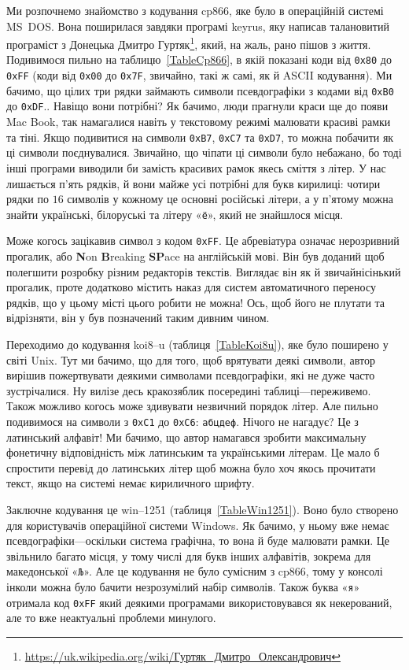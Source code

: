 \documentclass{book}
\newcommand{\bitstr}[1]{{\tt #1}}
\newcommand{\hexstr}[1]{{\tt 0x#1}}
\newcommand{\chr}[1]{«\texttt{#1}»}
\newcommand{\Gurtyak}{\href{https://uk.wikipedia.org/wiki/\%D0\%93\%D1\%83\%D1\%80\%D1\%82\%D1\%8F\%D0\%BA_\%D0\%94\%D0\%BC\%D0\%B8\%D1\%82\%D1\%80\%D0\%BE_\%D0\%9E\%D0\%BB\%D0\%B5\%D0\%BA\%D1\%81\%D0\%B0\%D0\%BD\%D0\%B4\%D1\%80\%D0\%BE\%D0\%B2\%D0\%B8\%D1\%87}{https://uk.wikipedia.org/wiki/Гуртяк\_Дмитро\_Олександрович}}
\begin{document}
Ми розпочнемо знайомство з кодування cp866, яке було в операційній системі MS~DOS.
Вона поширилася завдяки програмі keyrus, яку написав талановитий програміст з Донецька Дмитро Гуртяк\footnote{\Gurtyak}, який, на жаль, рано пішов з життя.
Подивимося пильно на таблицю~\ref{TableCp866}, в якій показані коди від \hexstr{80} до \hexstr{FF} (коди від \hexstr{00} до \hexstr{7F}, звичайно, такі ж самі, як й ASCII кодування).
Ми бачимо, що цілих три рядки займають символи псевдографіки з кодами від \hexstr{B0} до \hexstr{DF}..
Навіщо вони потрібні?
Як бачимо, люди прагнули краси ще до появи Mac Book, так намагалися навіть у текстовому режимі малювати красиві рамки та тіні.
Якщо подивитися на символи \hexstr{B7}, \hexstr{C7} та \hexstr{D7}, то можна побачити як ці символи поєднувалися.
Звичайно, що чіпати ці символи було небажано, бо тоді інші програми виводили би замість красивих рамок якесь сміття з літер.
У нас лишається п'ять рядків, й вони майже усі потрібні для букв кирилиці: чотири рядки по $16$ символів у кожному це основні російські літери, а у п'ятому можна знайти українські, білоруські та літеру \chr{ё}, який не знайшлося місця.

Може когось зацікавив символ  з кодом \hexstr{FF}.
Це абревіатура означає нерозривний прогалик, або \textbf{N}on \textbf{B}reaking \textbf{SP}ace на англійській мові.
Він був доданий щоб полегшити розробку різним редакторів текстів.
Виглядає він як й звичайнісінький прогалик, проте додатково містить наказ для систем автоматичного переносу рядків, що у цьому місті цього робити не можна!
Ось, щоб його не плутати та відрізняти, він у був позначений таким дивним чином.

Переходимо до кодування koi8--u (таблиця~\ref{TableKoi8u}), яке було поширено у світі Unix.
Тут ми бачимо, що для того, щоб врятувати деякі символи, автор вирішив пожертвувати деякими символами псевдографіки, які не дуже часто зустрічалися.
Ну вилізе десь кракозяблик посередині таблиці---переживемо.
Також можливо когось може здивувати незвичний порядок літер.
Але пильно подивимося на символи з \hexstr{C1} до \hexstr{C6}: \bitstr{абцдеф}.
Нічого не нагадує?
Це з латинський алфавіт!
Ми бачимо, що автор намагався зробити максимальну фонетичну відповідність між латинським та українськими літерам.
Це мало б спростити перевід до латинських літер щоб можна було хоч якось прочитати текст, якщо на системі немає кириличного шрифту.

Заключне кодування це win--1251 (таблиця~\ref{TableWin1251}).
Воно було створено для користувачів операційної системи Windows.
Як бачимо, у ньому вже немає псевдографіки---оскільки система графічна, то вона й буде малювати рамки.
Це звільнило багато місця, у тому числі для букв інших алфавітів, зокрема для македонської \chr{Љ}.
Але це кодування не було сумісним з cp866, тому у консолі інколи можна було бачити незрозумілий набір символів.
Також буква \chr{я} отримала код \hexstr{FF} який деякими програмами використовувався як некерований, але то вже неактуальні проблеми минулого.
\end{document}

